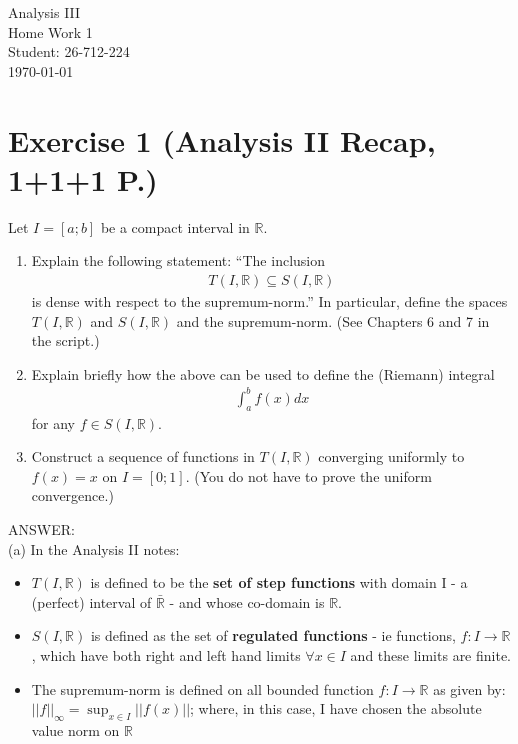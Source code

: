 \documentclass[12pt,a4paper]{article}
\begin{document}
\begin{titlepage}
\centering
\vspace*{\fill}
{\Huge Analysis III} \\[0.5cm]
{\Huge Home Work 1}\\[1.5cm]
{\Large Student: 26-712-224}\\[0.5cm]
{\Large \today}
\vspace*{\fill}
\end{titlepage}

\newpage
\section*{Exercise 1 (Analysis II Recap, 1+1+1 P.)}
Let $I=[a;b]$ be a compact interval in $\mathbb{R}$.
\begin{enumerate}[label=(\alph*)]
\item Explain the following statement: ``The inclusion
\begin{align*}
T(I,\mathbb{R}) \subseteq S(I,\mathbb{R})
\end{align*}
is dense with respect to the supremum-norm.'' In particular, define the spaces $T(I,\mathbb{R})$ and $S(I,\mathbb{R})$ and the supremum-norm. (See Chapters 6 and 7 in the script.)
\item Explain briefly how the above can be used to define the (Riemann) integral
\begin{align*}
\int_a^b f(x)dx
\end{align*}
for any $f\in S(I,\mathbb{R})$.
\item Construct a sequence of functions in $T(I,\mathbb{R})$ converging uniformly to $f(x)=x$ on $I=[0;1]$. (You do not have to prove the uniform convergence.)
\end{enumerate}
ANSWER:\\
(a) In the Analysis II notes:
\begin{itemize}
    \item $T(I, \mathbb{R})$ is defined to be the \textbf{set of step functions} with domain I - a (perfect) interval of $\bar{\mathbb{R}}$ - and 
whose co-domain is $\mathbb{R}$.
    \item $S(I, \mathbb{R})$ is defined as the set of \textbf{regulated functions} - ie functions, $f:I \to \mathbb{R}$, which have both right and 
left hand limits $\forall x \in I$ and these limits are finite.
    \item The supremum-norm is defined on all bounded function $f: I \to \mathbb{R}$ as given by: $||f||_{\infty} = \sup_{x \in I}||f(x)||$; where, 
    in this case, I have chosen the absolute value norm on $\mathbb{R}$
\end{itemize}
\end{document}
